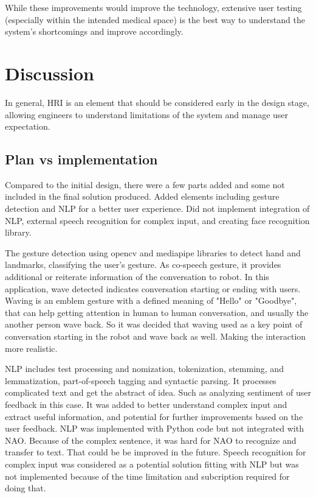 \documentclass[conference]{IEEEtran}
\begin{document}
While these improvements would improve the technology, extensive user testing (especially within the intended medical space) is the 
best way to understand the system's shortcomings and improve accordingly.


\section{Discussion}
In general, HRI is an element that should be considered early in the design stage, allowing engineers to understand limitations of the system and manage user expectation.
\subsection{Plan vs implementation}

Compared to the initial design, there were a few parts added and some not included in the final solution produced. Added elements including gesture detection and NLP for a better user experience. Did not implement integration of NLP, external speech recognition for complex input, and creating face recognition library.

The gesture detection using opencv and mediapipe libraries to detect hand and landmarks, classifying the user's gesture. As co-speech gesture, it provides additional or reiterate information of the conversation to robot. In this application, wave detected indicates conversation starting or ending with users. Waving is an emblem gesture with a defined meaning of "Hello" or "Goodbye", that can help getting attention in human to human conversation, and usually the another person wave back. So it was decided that waving used as a key point of conversation starting in the robot and wave back as well. Making the interaction more realistic.

NLP includes test processing and nomization, tokenization, stemming, and lemmatization, part-of-speech tagging and syntactic parsing. It processes complicated text and get the abstract of idea. Such as analyzing sentiment of user feedback in this case. It was added to better understand complex input and extract useful information, and potential for further improvements based on the user feedback. NLP was implemented with Python code but not integrated with NAO. Because of the complex sentence, it was hard for NAO to recognize and transfer to text. That could be be improved in the future. Speech recognition for complex input was considered as a potential solution fitting with NLP but was not implemented because of the time limitation and subcription required for doing that.
\end{document}
